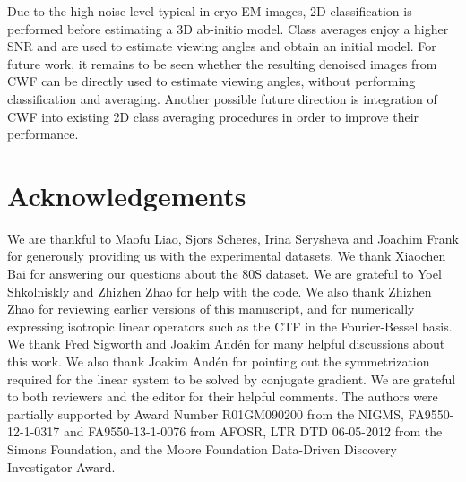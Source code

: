 \documentclass[review]{elsarticle}
\begin{document}
Due to the high noise level typical in cryo-EM images, 2D classification is performed before estimating a 3D ab-initio model. Class averages 
enjoy a higher SNR and are used to estimate viewing angles and obtain an initial model.
For future work, it remains to be seen whether the resulting denoised images from CWF can be directly used to estimate viewing angles,
without performing classification and averaging.
Another possible future direction is integration of CWF into existing 2D class averaging procedures in order to improve their performance.


\section{Acknowledgements}
We are thankful to Maofu Liao, Sjors Scheres, Irina Serysheva and Joachim Frank for generously
providing us with the experimental datasets. We thank Xiaochen Bai for answering our questions about the 80S dataset.
We are grateful to Yoel Shkolniskly and Zhizhen Zhao for help with the code. We also thank Zhizhen Zhao for reviewing earlier 
versions of this manuscript, and for numerically expressing isotropic linear operators such as the CTF in the Fourier-Bessel basis.
We thank Fred Sigworth and Joakim And\'en for many
helpful discussions about this work. We also thank Joakim And\'en for pointing out the symmetrization required for the linear system to be solved by conjugate gradient.   
We are grateful to both reviewers and the editor
for their helpful comments. The authors were partially supported by Award Number R01GM090200 from the NIGMS,
FA9550-12-1-0317 and FA9550-13-1-0076 from AFOSR, LTR DTD 06-05-2012 from the Simons
Foundation, and the Moore Foundation Data-Driven Discovery Investigator Award.

\clearpage



% 
 
\end{document}
